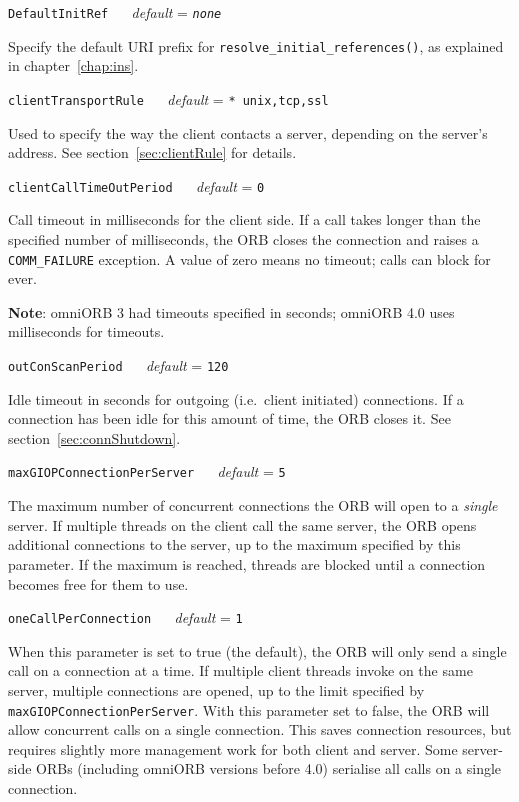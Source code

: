 \documentclass[11pt,twoside,a4paper]{book}
\makeatletter
\newcommand{\code}[1]{\texttt{#1}}
\newcommand{\op}[1]{\texttt{#1()}}
\newcommand{\confopt}[2]
  {\vspace{\baselineskip}\par\noindent\code{#1} ~~ \textit{default} =
   \code{#2}\\[-1ex]\@afterheading}
\newcommand{\dsc}{\discretionary{}{}{}}
\makeatother
\begin{document}
\confopt{DefaultInitRef}{\textit{none}}

Specify the default URI prefix for
\op{resolve\_\dsc{}initial\_\dsc{}references}, as explained in
chapter~\ref{chap:ins}.


\confopt{clientTransportRule}{* unix,tcp,ssl}

Used to specify the way the client contacts a server, depending on the
server's address. See section~\ref{sec:clientRule} for details.


\confopt{clientCallTimeOutPeriod}{0}

Call timeout in milliseconds for the client side. If a call takes
longer than the specified number of milliseconds, the ORB closes the
connection and raises a \code{COMM\_\dsc{}FAILURE} exception. A value
of zero means no timeout; calls can block for ever.

\vspace{.5\baselineskip}

\noindent\textbf{Note}: omniORB 3 had timeouts specified in seconds; omniORB
4.0 uses milliseconds for timeouts.


\confopt{outConScanPeriod}{120}

Idle timeout in seconds for outgoing (i.e.\ client initiated)
connections. If a connection has been idle for this amount of time,
the ORB closes it. See section~\ref{sec:connShutdown}.


\confopt{maxGIOPConnectionPerServer}{5}

The maximum number of concurrent connections the ORB will open to a
\emph{single} server. If multiple threads on the client call the same
server, the ORB opens additional connections to the server, up to the
maximum specified by this parameter. If the maximum is reached,
threads are blocked until a connection becomes free for them to use.


\confopt{oneCallPerConnection}{1}

When this parameter is set to true (the default), the ORB will only
send a single call on a connection at a time. If multiple client
threads invoke on the same server, multiple connections are opened, up
to the limit specified by
\code{maxGIOPConnection\dsc{}PerServer}. With this parameter set to
false, the ORB will allow concurrent calls on a single
connection. This saves connection resources, but requires slightly
more management work for both client and server. Some server-side ORBs
(including omniORB versions before 4.0) serialise all calls on a
single connection.
\end{document}
